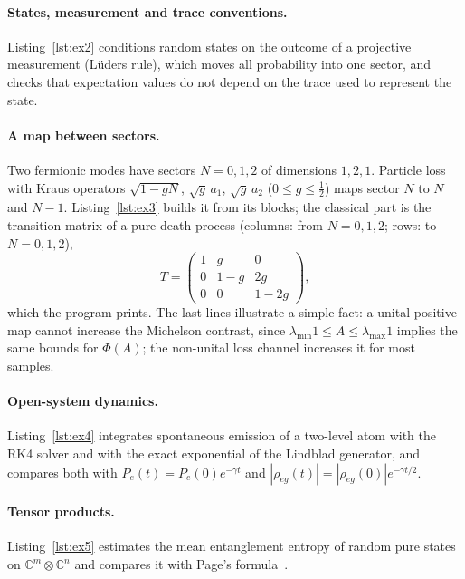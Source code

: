 \documentclass[11pt]{article}
\newcommand{\C}{\mathbb{C}}
\begin{document}
\paragraph{States, measurement and trace conventions.} Listing~\ref{lst:ex2} conditions random states on
the outcome of a projective measurement (Lüders rule), which moves all probability into one sector, and
checks that expectation values do not depend on the trace used to represent the state.


\paragraph{A map between sectors.} Two fermionic modes have sectors $N=0,1,2$ of dimensions $1,2,1$.
Particle loss with Kraus operators $\sqrt{1-gN}$, $\sqrt g\,a_1$, $\sqrt g\,a_2$ ($0\le g\le\frac12$) maps sector $N$ to
$N$ and $N-1$. Listing~\ref{lst:ex3} builds it from its blocks; the classical part is the transition
matrix of a pure death process (columns: from $N=0,1,2$; rows: to $N=0,1,2$),
\[
  T=\begin{pmatrix}1&g&0\\0&1-g&2g\\0&0&1-2g\end{pmatrix},
\]
which the program prints. The last lines illustrate a simple fact: a unital positive map cannot
increase the Michelson contrast, since $\lambda_{\min}1\le A\le\lambda_{\max}1$ implies the same bounds
for $\Phi(A)$; the non-unital loss channel increases it for most samples.


\paragraph{Open-system dynamics.} Listing~\ref{lst:ex4} integrates spontaneous emission of a two-level
atom with the RK4 solver and with the exact exponential of the Lindblad generator, and compares both with
$P_e(t)=P_e(0)e^{-\gamma t}$ and $|\rho_{eg}(t)|=|\rho_{eg}(0)|e^{-\gamma t/2}$.


\paragraph{Tensor products.} Listing~\ref{lst:ex5} estimates the mean entanglement entropy of random
pure states on $\C^m\otimes\C^n$ and compares it with Page's formula~\cite{page1993}.

\end{document}
